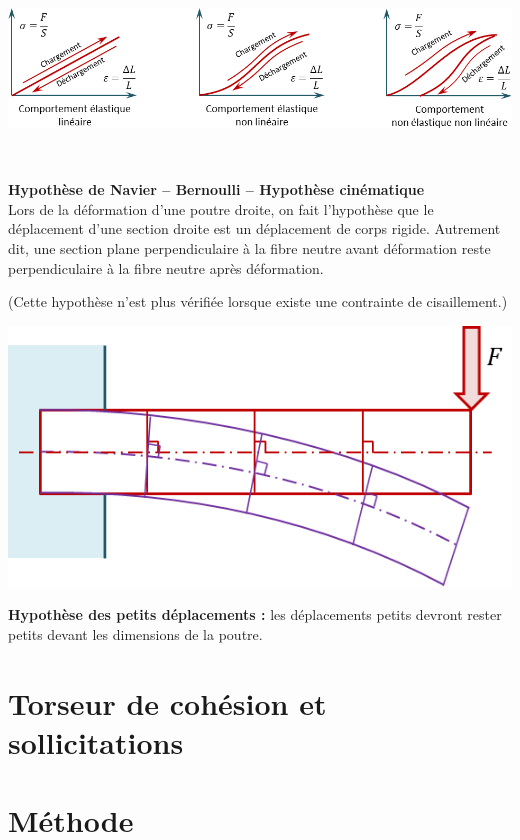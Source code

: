 \documentclass[10pt,fleqn]{article} %
\begin{document}
\begin{center}
\includegraphics[width=.8\linewidth]{images/ElastiqueLineaire}
\end{center}

\begin{hypo} ~\\

\noindent\begin{minipage}[c]{.65\linewidth}
\textbf{Hypothèse de Navier -- Bernoulli -- Hypothèse cinématique}\\
Lors de la déformation d'une poutre droite, on fait l'hypothèse que le déplacement d'une section droite est un déplacement de corps rigide. Autrement dit, une section plane perpendiculaire à la fibre neutre avant déformation reste perpendiculaire à la fibre neutre après déformation.

(Cette hypothèse n'est plus vérifiée lorsque existe une contrainte de cisaillement.)
\end{minipage} \hfill
\begin{minipage}[c]{.3\linewidth}
\begin{center}
\includegraphics[width=\linewidth]{images/navier}
\end{center}
\end{minipage}

\end{hypo}

\begin{hypo}
\textbf{Hypothèse des petits déplacements :} les déplacements petits devront rester petits devant les dimensions de la poutre. 
\end{hypo}

\section{Torseur de cohésion et sollicitations}


\section{Méthode}
\end{document}
